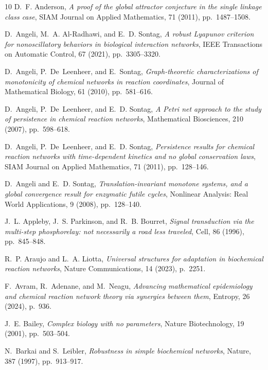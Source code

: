 \documentclass[onefignum,onetabnum]{siamonline220329}
\begin{document}
{\begin{thebibliography}{10}
	{\sc D.~F. Anderson}, {\em A proof of the global attractor conjecture in the
		single linkage class case}, SIAM Journal on Applied Mathematics, 71 (2011),
	pp.~1487--1508.
	
	{\sc D.~Angeli, M.~A. Al-Radhawi, and E.~D. Sontag}, {\em A robust {L}yapunov
		criterion for nonoscillatory behaviors in biological interaction networks},
	IEEE Transactions on Automatic Control, 67 (2021), pp.~3305--3320.
	
	{\sc D.~Angeli, P.~De~Leenheer, and E.~Sontag}, {\em Graph-theoretic
		characterizations of monotonicity of chemical networks in reaction
		coordinates}, Journal of Mathematical Biology, 61 (2010), pp.~581--616.
	
	{\sc D.~Angeli, P.~De~Leenheer, and E.~D. Sontag}, {\em A {P}etri net approach
		to the study of persistence in chemical reaction networks}, Mathematical
	Biosciences, 210 (2007), pp.~598--618.
	
	{\sc D.~Angeli, P.~De~Leenheer, and E.~D. Sontag}, {\em Persistence results for
		chemical reaction networks with time-dependent kinetics and no global
		conservation laws}, SIAM Journal on Applied Mathematics, 71 (2011),
	pp.~128--146.
	
	{\sc D.~Angeli and E.~D. Sontag}, {\em Translation-invariant monotone systems,
		and a global convergence result for enzymatic futile cycles}, Nonlinear
	Analysis: Real World Applications, 9 (2008), pp.~128--140.
	
	{\sc J.~L. Appleby, J.~S. Parkinson, and R.~B. Bourret}, {\em Signal
		transduction via the multi-step phosphorelay: not necessarily a road less
		traveled}, Cell, 86 (1996), pp.~845--848.
	
	{\sc R.~P. Araujo and L.~A. Liotta}, {\em Universal structures for adaptation
		in biochemical reaction networks}, Nature Communications, 14 (2023), p.~2251.
	
	{\sc F.~Avram, R.~Adenane, and M.~Neagu}, {\em Advancing mathematical
		epidemiology and chemical reaction network theory via synergies between
		them}, Entropy, 26 (2024), p.~936.
	
	{\sc J.~E. Bailey}, {\em Complex biology with no parameters}, Nature
	Biotechnology, 19 (2001), pp.~503--504.
	
	{\sc N.~Barkai and S.~Leibler}, {\em Robustness in simple biochemical
		networks}, Nature, 387 (1997), pp.~913--917.
	

\end{thebibliography}}
\end{document}
